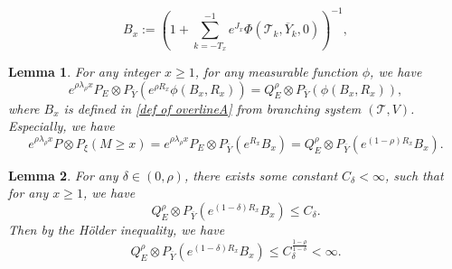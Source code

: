 \documentclass[10pt,a4paper]{amsart}
\newtheorem{lemma}{Lemma}
\begin{document}
	\begin{equation}\label{def of overlineA}
		B_x:= \left(1+\sum_{k=-T_x}^{-1}e^{J_x}\Phi(\mathcal{T}_k,\overline{Y}_k,0)\right)^{-1},
	\end{equation}

	\begin{lemma}\label{Measure change Relationship 2}
		For any integer $x\geqslant 1$, for any measurable function $\phi$, we have
		\begin{equation}
			e^{\rho\lambda_\rho x}P_E\otimes P_{\overline{Y}} (e^{\rho R_x}\phi(B_x,R_x)) = Q^\rho_E\otimes P_{\overline{Y}} ( \phi(B_x,R_x) ),
		\end{equation}
		where $B_x$ is defined in \cref{def of overlineA} from branching system $(\mathcal{T},V)$.
		Especially, we have
		\begin{equation}
			e^{\rho\lambda_\rho x} P\otimes P_\xi(M\geqslant x)
			=
			e^{\rho\lambda_\rho x} P_E\otimes P_{\overline{Y}}(e^{R_x}B_x)
			=
			Q^\rho_E\otimes P_{\overline{Y}} (e^{(1-\rho)R_x}B_x).
		\end{equation}
	\end{lemma}

	\begin{lemma}\label{lemma of weakly 2}
		For any $\delta\in (0,\rho)$, there exists some constant $ C_\delta <\infty $, such that for any $x\geqslant1$, we have
		\begin{equation*}
			Q^\rho_E\otimes P_{\overline{Y}} \left(
			e^{(1-\delta)R_x} B_x
			\right) \leqslant C_\delta.
		\end{equation*}
	Then by the H\"older inequality, we have
	\begin{equation}
		Q^\rho_E\otimes P_{\overline{Y}} \left(
		e^{(1-\delta)R_x} B_x
		\right) \leqslant C_\delta^{\frac{1-\rho}{1-\delta}}<\infty.
	\end{equation}
\end{lemma}
\end{document}
